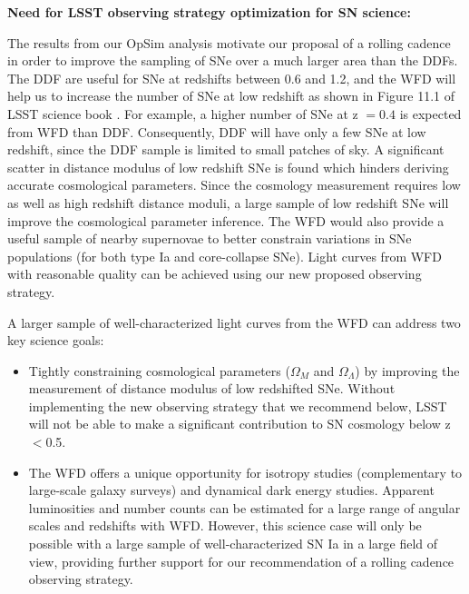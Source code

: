 
{\bf Need for LSST observing strategy optimization for SN science:}

The results from our OpSim analysis motivate our proposal of a rolling cadence
in order to improve the sampling of SNe over a much larger area than the DDFs.
The DDF are useful for SNe at redshifts between 0.6 and 1.2, and the WFD will help us to increase
the number of SNe at low redshift
as shown in Figure 11.1 of LSST science book \citep{2009arXiv0912.0201L}. For example, a higher
number of SNe at z $=0.4$ is expected from WFD than DDF.
Consequently, DDF will have only a few SNe at low redshift,
since the DDF sample is limited to small patches of sky.
A significant scatter in distance modulus of low redshift SNe is found \citep[e.g.][]{Suzuki2012} which hinders deriving accurate
cosmological parameters.
Since the cosmology measurement requires low as well as high redshift distance moduli, a large
sample
of low redshift SNe will improve the cosmological parameter inference. The WFD would also provide a
useful sample of nearby supernovae to better constrain variations in SNe populations (for both
type Ia and core-collapse SNe).
Light curves from WFD
with reasonable quality can be achieved using our new proposed
observing strategy.

A larger sample of well-characterized light curves from the WFD can address two key science
goals:
\begin{itemize}
\item Tightly constraining cosmological parameters ($\Omega_M$ and $\Omega_\Lambda$)
by improving the measurement of distance modulus of low redshifted SNe. Without implementing
the new observing strategy that we recommend below, LSST will not be able to
make a significant contribution to SN cosmology below z$<$0.5.
\item The WFD offers a unique opportunity for isotropy studies (complementary to large-scale galaxy
surveys) and dynamical dark energy studies. Apparent luminosities and number counts can be
estimated for a large range of angular scales and
redshifts with WFD. However, this science case will only be possible with a large sample of
well-characterized SN Ia in a large field of view, providing further support for our
recommendation of a rolling cadence observing strategy.
\end{itemize}



